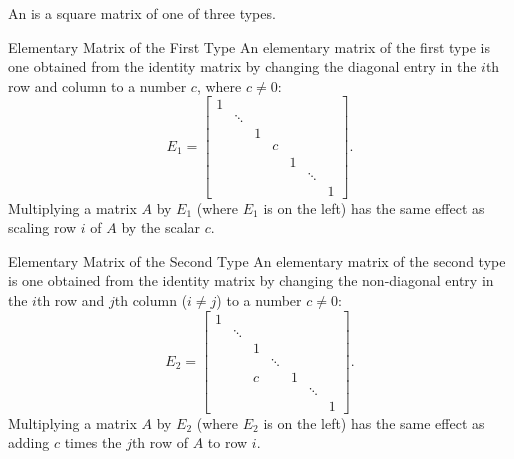 


\edXsolution{

}

\endedxproblem

\endedxvertical





{}  An {} is a square matrix of one of three types.  


\begin{edXshowhide}{Elementary Matrix of the First Type}
An elementary matrix of the first type is one obtained from the identity matrix by changing the diagonal entry in the 
$i$th row and column to a number 
$c$, where $c \ne 0$:  
\[ E_1 = \left[ 
\begin{array}{ccccccc}
1 &  &  &  &  &  &  \\
 & \ddots &  &  &  &  &  \\
 &   & 1& &  &  &  \\
 &   &  &  c &  &  &  \\
 &   &  &  & 1 &  &  \\
 &   &  &  &  & \ddots  &  \\
 &   &  &  &  &   & 1 
\end{array}
\right].  \]
Multiplying  a matrix $A$ by $E_1$ (where $E_1$ is on the left) has the same effect as scaling row $i$ of $A$ by the scalar $c$.  
\end{edXshowhide}

\begin{edXshowhide}{Elementary Matrix of the Second Type}
An elementary matrix of the second type is one obtained from the identity matrix by changing the non-diagonal entry in the $i$th row and $j$th column ($i\ne j$) to a number $c \ne 0$: 
\[ E_2 = \left[ 
\begin{array}{ccccccc}
1 &  &  &  &  &  &  \\
 & \ddots &  &  &  &  &  \\
 &   & 1& &  &  &  \\
 &   &  &  \ddots &  &  &  \\
 &   &  c &  & 1 &  &  \\
 &   &  &  &  & \ddots  &  \\
 &   &  &  &  &   & 1 
\end{array}
\right].  \]
Multiplying  a matrix $A$ by $E_2$ (where $E_2$ is on the left) has the same effect as adding $c$ times the $j$th row of $A$ to row $i$.  
\end{edXshowhide}

